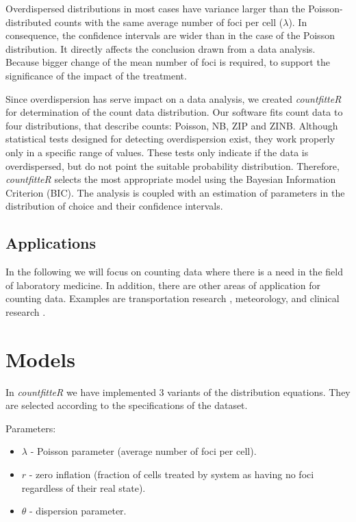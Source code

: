 Overdispersed distributions in most cases have variance larger than the Poisson-distributed counts with the same average number of foci per cell ($\lambda$). In consequence, the confidence intervals are wider than in the case of the Poisson distribution. It directly affects the conclusion drawn from a data analysis. Because bigger change of the mean number of foci is required, to support the significance of the impact of the treatment. 

Since overdispersion has serve impact on a data analysis, we created \emph{countfitteR} for determination of the count data distribution. Our software fits count data to four distributions, that describe counts: Poisson, NB, ZIP and ZINB. Although statistical tests designed for detecting overdispersion exist, they work properly only in a specific range of values. These tests only indicate if the data is overdispersed, but do not point the suitable probability distribution. Therefore, \emph{countfitteR} selects the most appropriate model using the Bayesian Information Criterion (BIC). The analysis is coupled with an estimation of parameters in the distribution of choice and their confidence intervals.  

\subsection{Applications}

In the following we will focus on counting data where there is a need in the field of laboratory medicine. In addition, there are other areas of application for counting data. Examples are transportation research \citep{narayanamoorthy_accommodating_2013}, meteorology, \citep{brijs_studying_2008} and clinical research \citep{keene_analysis_2007}.


\section{Models}

In \emph{countfitteR} we have implemented 3 variants of the distribution equations. They are selected according to the specifications of the dataset. %

Parameters:
\begin{itemize}
\item $\lambda$ - Poisson parameter (average number of foci per cell). 
\item $r$ - zero inflation (fraction of cells treated by system as having no foci regardless of their real state).
\item $\theta$ - dispersion parameter.
\end{itemize}


